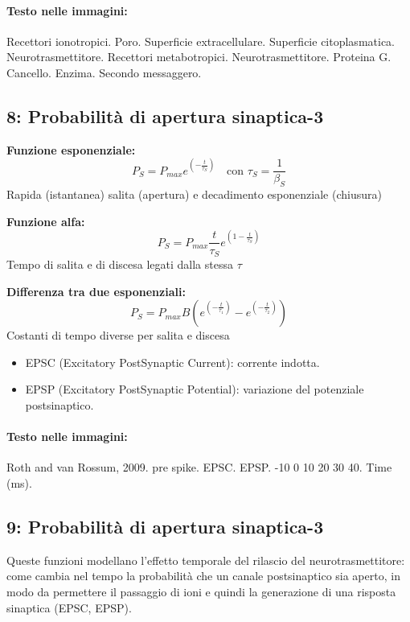 \paragraph*{Testo nelle immagini:}
Recettori ionotropici. Poro. Superficie extracellulare. Superficie citoplasmatica. Neurotrasmettitore. Recettori metabotropici. Neurotrasmettitore. Proteina G. Cancello. Enzima. Secondo messaggero.


\subsection*{ 8: Probabilità di apertura sinaptica-3}

\textbf{Funzione esponenziale:}
\[ P_{S} = P_{max} e^{\left(-\frac{t}{\tau_{S}}\right)} \quad \text{con } \tau_{S} = \frac{1}{\beta_{S}} \]
Rapida (istantanea) salita (apertura) e decadimento esponenziale (chiusura)

\vspace{0.5cm}
\textbf{Funzione alfa:}
\[ P_{S} = P_{max} \frac{t}{\tau_{S}} e^{\left(1-\frac{t}{\tau_{S}}\right)} \]
Tempo di salita e di discesa legati dalla stessa $\tau$

\vspace{0.5cm}
\textbf{Differenza tra due esponenziali:}
\[ P_{S} = P_{max} B \left( e^{\left(-\frac{t}{\tau_{1}}\right)} - e^{\left(-\frac{t}{\tau_{2}}\right)} \right) \]
Costanti di tempo diverse per salita e discesa

\begin{itemize}
    \item EPSC (Excitatory PostSynaptic Current): corrente indotta.
    \item EPSP (Excitatory PostSynaptic Potential): variazione del potenziale postsinaptico.
\end{itemize}

\paragraph*{Testo nelle immagini:}
Roth and van Rossum, 2009. pre spike. EPSC. EPSP. -10 0 10 20 30 40. Time (ms).


\subsection*{ 9: Probabilità di apertura sinaptica-3}

Queste funzioni modellano l'effetto temporale del rilascio del neurotrasmettitore: come cambia nel tempo la probabilità che un canale postsinaptico sia aperto, in modo da permettere il passaggio di ioni e quindi la generazione di una risposta sinaptica (EPSC, EPSP).

